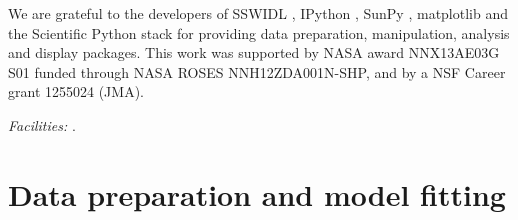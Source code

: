 \documentclass[onecolumn]{emulateapj}
\begin{document}
\acknowledgments
We are grateful to the developers of SSWIDL
\citep{1998SoPh..182..497F}, IPython \citep{ipython}, SunPy
\citep{mumford-proc-scipy-2013}, matplotlib
\citep{Hunter:2007} and the Scientific Python stack for providing data
preparation, manipulation, analysis and display packages.  This work
was supported by NASA award NNX13AE03G S01 funded through NASA ROSES
NNH12ZDA001N-SHP, and by a NSF Career grant 1255024 (JMA).




{\it Facilities:} .



\appendix\section{Data preparation and model
  fitting}\label{sec:app:data}
\end{document}
